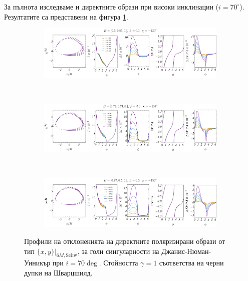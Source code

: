 За пълнота изследваме и директните образи при високи инклинации ($i = 70^\circ$). Резултатите са представени на фигура \ref{JNW_delta_r6_70_deg}.

\begin{figure}[!htb]
	\begin{subfigure}{12cm}
		\hspace{-0.5cm}
		\includegraphics[scale = 0.4]{JNW/pol_70_1.pdf}
	\end{subfigure}\\
	\begin{subfigure}{12cm}
		\hspace{-0.5cm}
		\includegraphics[scale = 0.4]{JNW/pol_70_2.pdf}
	\end{subfigure}\\
	\begin{subfigure}{12cm}
		\hspace{-0.5cm}
		\includegraphics[scale = 0.3]{JNW/pol_70_3.pdf}
	\end{subfigure}
	\caption[Профили на отклоненията на директните поляризирани образи oт тип $\{x,y\}\vert_{6M, \text{Schw}}$, за $i = 70\deg$ за голи сингуларности на Джанис-Нюман-Уиникър.]{\small Профили на отклоненията на директните поляризирани образи от тип $\{x,y\}\vert_{6M, \text{Schw}}$, за голи сингуларности на Джанис-Нюман-Уиникър при $i = 70\deg$. Стойността $\gamma = 1$ съответства на черни дупки на Шварцшилд.} 
	\label{JNW_delta_r6_70_deg}
\end{figure}
